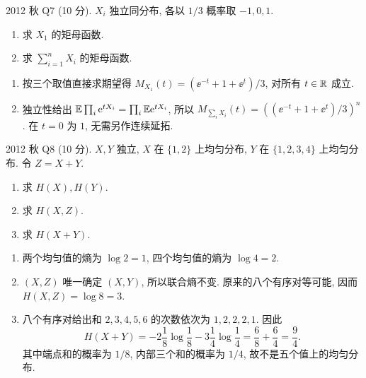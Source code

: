 \begin{exercise}\label{ex:fe2012q7}
2012 秋 Q7 (10 分). $X_i$ 独立同分布, 各以 $1/3$ 概率取 $-1,0,1$.
\begin{enumerate}[label=(\alph*)]
\item\label{ex:fe2012q7-a} 求 $X_1$ 的矩母函数.
\item\label{ex:fe2012q7-b} 求 $\sum_{i=1}^nX_i$ 的矩母函数.
\end{enumerate}
\end{exercise}
\begin{solution}
\begin{enumerate}[label=(\alph*)]
\item\label{sol:fe2012q7-a} 按三个取值直接求期望得 $M_{X_1}(t)=(\ee^{-t}+1+\ee^t)/3$, 对所有 $t\in\mathbb R$ 成立.
\item\label{sol:fe2012q7-b} 独立性给出 $\mathbb E\prod_i\mathrm e^{tX_i}=\prod_i\mathbb E\mathrm e^{tX_i}$, 所以
$M_{\sum_iX_i}(t)=((\ee^{-t}+1+\ee^t)/3)^n$. 在 $t=0$ 为 $1$, 无需另作连续延拓.
\end{enumerate}
\end{solution}

\begin{exercise}\label{ex:fe2012q8}
2012 秋 Q8 (10 分). $X,Y$ 独立, $X$ 在 $\{1,2\}$ 上均匀分布, $Y$ 在 $\{1,2,3,4\}$ 上均匀分布. 令 $Z=X+Y$.
\begin{enumerate}[label=(\alph*)]
\item\label{ex:fe2012q8-a} 求 $H(X),H(Y)$.
\item\label{ex:fe2012q8-b} 求 $H(X,Z)$.
\item\label{ex:fe2012q8-c} 求 $H(X+Y)$.
\end{enumerate}
\end{exercise}
\begin{solution}
\begin{enumerate}[label=(\alph*)]
\item\label{sol:fe2012q8-a} 两个均匀值的熵为 $\log2=1$, 四个均匀值的熵为 $\log4=2$.
\item\label{sol:fe2012q8-b} $(X,Z)$ 唯一确定 $(X,Y)$, 所以联合熵不变. 原来的八个有序对等可能, 因而 $H(X,Z)=\log8=3$.
\item\label{sol:fe2012q8-c} 八个有序对给出和 $2,3,4,5,6$ 的次数依次为 $1,2,2,2,1$. 因此
\[
 H(X+Y)=-2\frac18\log\frac18-3\frac14\log\frac14
 =\frac{6}{8}+\frac{6}{4}=\frac94.
\]
其中端点和的概率为 $1/8$, 内部三个和的概率为 $1/4$, 故不是五个值上的均匀分布.
\end{enumerate}
\end{solution}

